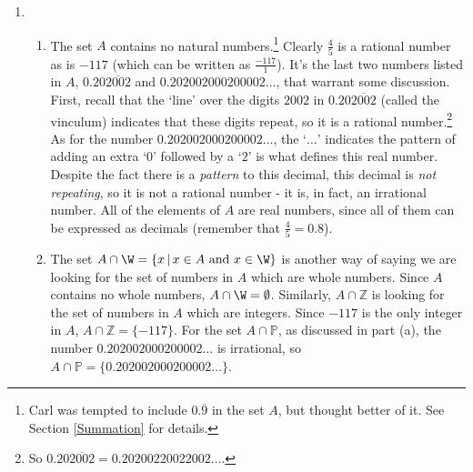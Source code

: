 \documentclass{ximera}
\begin{document}
\begin{example}
\begin{enumerate}
\smallskip

So suppose $s \in S$.  What can be said about $s$?  We know there is some real number $x$ so that $s = x^2$.  Since $x^2 \geq 0$ for any real number $x$, we know $s \geq 0$.  This tells us that everything in $S$ is a non-negative real number.\footnote{This means $S$ is a subset of the non-negative real numbers.}  This begs the question:  are \underline{all} of the non-negative real numbers in $S$?  Suppose $n$ is a non-negative real number, that is, $n \geq 0$.  If $n$ were in $S$, there would be a real number $x$ so that $x^2=n$.  As you may recall, we can solve $x^2 = n$ by `extracting square roots':  $x = \pm \sqrt{n}$.  Since $n \geq 0$, $\sqrt{n}$ is a real number.\footnote{This is called the `square root closed property' of the non-negative real numbers.}  Moreover, $(\sqrt{n})^2 = n$ so $n$ is the square of a real number which means $n \in S$. Hence, $S$ is the set of non-negative real numbers.

\label{repeatingdecimalnote}

\item  \begin{enumerate} \item The set $A$ contains no natural numbers.\footnote{Carl was tempted to include $0.\overline{9}$ in the set $A$, but thought better of it.  See Section \ref{Summation} for details.}  Clearly $\frac{4}{5}$ is a rational number as is $-117$ (which can be written as $\frac{-117}{1}$). It's the last two numbers listed in $A$, $0.20\overline{2002}$ and $0.202002000200002 \ldots$, that warrant some discussion.  First, recall that the `line' over the digits $2002$ in $0.20\overline{2002}$ (called the vinculum) indicates that these digits repeat, so it is a rational number.\footnote{So $0.20\overline{2002} = 0.20200220022002 \ldots$.}  As for the number $0.202002000200002 \ldots$, the `$\ldots$' indicates the pattern of adding an extra `$0$' followed by a `$2$' is what defines this real number.  Despite the fact there is a \textit{pattern} to this decimal, this decimal is \textit{not repeating}, so it is not a rational number - it is, in fact, an irrational number.  All of the elements of $A$ are real numbers, since all of them can be expressed as decimals (remember that $\frac{4}{5} = 0.8$).

\item  The set $A \cap \W = \{ x \, | \, \text{$x \in A$ and $x \in \W$} \}$ is another way of saying we are looking for the set of numbers in $A$ which are whole numbers.  Since $A$ contains no whole numbers, $A \cap \W = \emptyset$.  Similarly, $A \cap \mathbb Z$ is looking for the set of numbers in $A$ which are integers.  Since $-117$ is the only integer in $A$,  $A \cap \mathbb Z = \{ -117 \}$. For the set $A \cap \mathbb P$, as discussed in part (a), the number $0.202002000200002 \ldots$ is irrational, so $A \cap \mathbb P = \{ 0.202002000200002 \ldots \}$.


\end{enumerate}
\end{enumerate}
\end{example}
\end{document}
